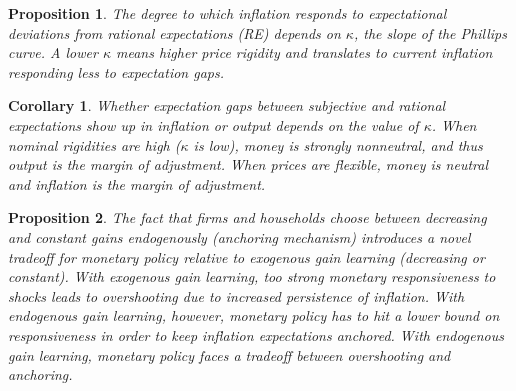 \documentclass[11pt]{article}
\renewcommand{\[}{\begin{equation}}
\renewcommand{\]}{\end{equation}}
\newtheorem{prop}{Proposition}
\newtheorem{corollary}{Corollary}
\begin{document}
\clearpage
	\begin{prop} The degree to which inflation responds to expectational deviations from rational expectations (RE) depends on $\kappa$, the slope of the Phillips curve. A lower $\kappa$ means higher price rigidity and translates to current inflation responding less to expectation gaps.
	\end{prop}
	\begin{corollary}Whether expectation gaps between subjective and rational expectations show up in inflation or output depends on the value of $\kappa$. When nominal rigidities are high ($\kappa$ is low), money is strongly nonneutral, and thus output is the margin of adjustment. When prices are flexible, money is neutral and inflation is the margin of adjustment. 
	\end{corollary}
	\begin{prop} The fact that firms and households choose between decreasing and constant gains endogenously (anchoring mechanism) introduces a novel tradeoff for monetary policy relative to exogenous gain learning (decreasing or constant). With exogenous gain learning, too strong monetary responsiveness to shocks leads to overshooting due to increased persistence of inflation. With endogenous gain learning, however, monetary policy has to hit a lower bound on responsiveness in order to keep inflation expectations anchored. With endogenous gain learning, monetary policy faces a tradeoff between overshooting and anchoring. 
	\end{prop}
\end{document}
